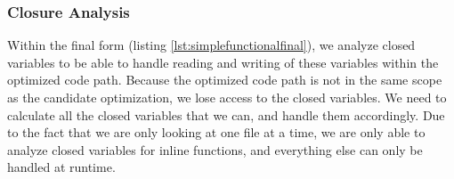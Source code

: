 \subsubsection{Closure Analysis}
Within the final form (listing \ref{lst:simplefunctionalfinal}), we analyze closed variables to be able to handle reading and writing of these variables within the optimized code path. Because the optimized code path is not in the same scope as the candidate optimization, we lose access to the closed variables.  We need to calculate all the closed variables that we can, and handle them accordingly.  Due to the fact that we are only looking at one file at a time, we are only able to analyze closed variables for inline functions, and everything else can only be handled at runtime.  